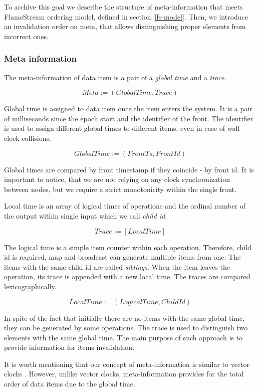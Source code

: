 To archive this goal we describe the structure of meta-information that meets FlameStream ordering model, defined in section~\ref{fs-model}. Then, we introduce an invalidation order on meta, that allows distinguishing proper elements from incorrect ones.

\subsubsection{Meta information}
The meta-information of data item is a pair of a {\it global time} and a {\it trace}.

\[Meta := (GlobalTime, Trace)\]

Global time is assigned to data item once the item enters the system. It is a pair of milliseconds since the epoch start and the identifier of the front. The identifier is used to assign different global times to different items, even in case of wall-clock collisions. 

\[GlobalTime := (FrontTs, FrontId)\]

Global times are compared by front timestamp if they coincide - by front id. It is important to notice, that we are not relying on any clock synchronization between nodes, but we require a strict monotonicity within the single front.

Local time is an array of logical times of operations and the ordinal number of the output within single input which we call {\it child id}. 

\[Trace := [LocalTime]\]

The logical time is a simple item counter within each operation. Therefore, child id is required, map and broadcast can generate multiple items from one. The items with the same child id are called {\it siblings}. When the item leaves the operation, its trace is appended with a new local time. The traces are compared lexicographically.

\[LocalTime := (LogicalTime, ChildId)\]

In spite of the fact that initially there are no items with the same global time, they can be generated by some operations. The trace is used to distinguish two elements with the same global time. The main purpose of such approach is to provide information for items invalidation. 

It is worth mentioning that our concept of meta-information is similar to vector clocks
\cite{fidge1988timestamps, mattern88virtualtime}. However, unlike vector clocks, meta-information provides for the total order of data items due to the global time.

